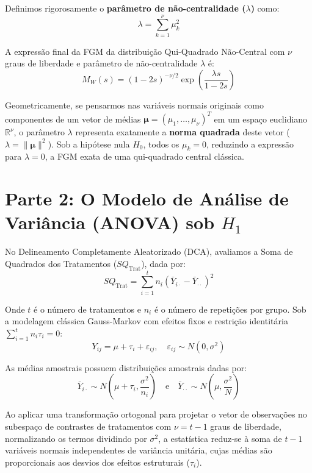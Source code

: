 \documentclass[
]{article}
\begin{document}
Definimos rigorosamente o \textbf{parâmetro de não-centralidade
(\(\lambda\))} como: \[\lambda = \sum_{k=1}^{\nu} \mu_k^2\]

A expressão final da FGM da distribuição Qui-Quadrado Não-Central com
\(\nu\) graus de liberdade e parâmetro de não-centralidade \(\lambda\)
é:
\[M_W(s) = (1 - 2s)^{-\nu/2} \exp\left( \frac{\lambda s}{1 - 2s} \right)\]

Geometricamente, se pensarmos nas variáveis normais originais como
componentes de um vetor de médias
\(\symbf{\mu} = (\mu_1, \dots, \mu_\nu)^T\) em um espaço euclidiano
\(\mathbb{R}^\nu\), o parâmetro \(\lambda\) representa exatamente a
\textbf{norma quadrada} deste vetor (\(\lambda = \|\symbf{\mu}\|^2\)).
Sob a hipótese nula \(H_0\), todos os \(\mu_k = 0\), reduzindo a
expressão para \(\lambda = 0\), a FGM exata de uma qui-quadrado central
clássica.

\section{\texorpdfstring{Parte 2: O Modelo de Análise de Variância
(ANOVA) sob
\(H_1\)}{Parte 2: O Modelo de Análise de Variância (ANOVA) sob H\_1}}\label{parte-2-o-modelo-de-anuxe1lise-de-variuxe2ncia-anova-sob-h_1}

No Delineamento Completamente Aleatorizado (DCA), avaliamos a Soma de
Quadrados dos Tratamentos (\(SQ_{\text{Trat}}\)), dada por:
\[SQ_{\text{Trat}} = \sum_{i=1}^{t} n_i (\bar Y_{i\cdot} - \bar Y_{\cdot\cdot})^2\]

Onde \(t\) é o número de tratamentos e \(n_i\) é o número de repetições
por grupo. Sob a modelagem clássica Gauss-Markov com efeitos fixos e
restrição identitária \(\sum_{i=1}^{t} n_i \tau_i = 0\):
\[Y_{ij} = \mu + \tau_i + \varepsilon_{ij}, \quad \varepsilon_{ij} \sim N(0, \sigma^2)\]

As médias amostrais possuem distribuições amostrais dadas por:
\[\bar Y_{i\cdot} \sim N\left( \mu + \tau_i, \frac{\sigma^2}{n_i} \right) \quad \text{e} \quad \bar Y_{\cdot\cdot} \sim N\left( \mu, \frac{\sigma^2}{N} \right)\]

Ao aplicar uma transformação ortogonal para projetar o vetor de
observações no subespaço de contrastes de tratamentos com
\(\nu = t - 1\) graus de liberdade, normalizando os termos dividindo por
\(\sigma^2\), a estatística reduz-se à soma de \(t-1\) variáveis normais
independentes de variância unitária, cujas médias são proporcionais aos
desvios dos efeitos estruturais (\(\tau_i\)).
\end{document}
